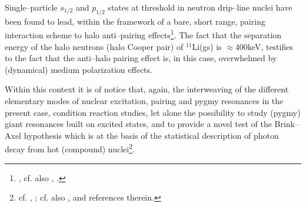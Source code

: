    
   
 Single--particle $s_{1/2}$ and $p_{1/2}$ states at threshold in neutron drip--line nuclei have been found to lead, within the framework of a bare, short range, pairing interaction scheme to halo anti--pairing effects\footnote{\citet{Bennaceur:00}, cf. also \citet{Hamamoto:03}, \citet{Hamamoto:04}.}. The fact that the separation energy of the halo neutrons (halo Cooper pair) of $^{11}$Li(gs) is $\approx 400$keV, testifies to the fact that the anti--halo pairing effect is, in this case, overwhelmed by (dynamical) medium polarization effects.
 
 Within this context it is of notice that, again, the interweaving of the different elementary modes of nuclear excitation, pairing and pygmy resonances in the present case, condition reaction studies, let alone the possibility to study (pygmy) giant resonances built on excited states, and to provide a novel test of the Brink--Axel hypothesis which is at the basis of the statistical description of photon decay from hot (compound) nuclei\footnote{cf. \cite{Axel:62}, \citet{Brink:55}; cf. also \citet{Bortignon:98}, \cite{Bertsch:86} and references therein.}. 
 
